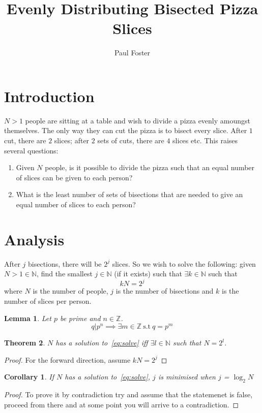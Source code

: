 \documentclass{article}
\title{Evenly Distributing Bisected Pizza Slices}
\author{Paul Foster}
\begin{document}
\maketitle

\newtheorem{theorem}{Theorem}
\newtheorem{corollary}{Corollary}[theorem]
\newtheorem{lemma}[theorem]{Lemma}

\section{Introduction}
$N>1$ people are sitting at a table and wish to divide a pizza evenly amoungst themselves. The only way they can cut the pizza is to bisect every slice. After $1$ cut, there are $2$ slices; after $2$ sets of cuts, there are $4$ slices etc. This raises several questions:
\begin{enumerate}
  \item Given $N$ people, is it possible to divide the pizza such that an equal number of slices can be given to each person?
  \item What is the least number of sets of bisections that are needed to give an equal number of slices to each person?
\end{enumerate}

\section{Analysis}
After $j$ bisections, there will be $2^j$ slices. So we wish to solve the following: given $N>1 \in \mathbb{N}$, find the smallest $j \in \mathbb{N}$ (if it exists) such that $\exists k \in \mathbb{N}$ such that
\begin{equation} \label{eq:solve}
  kN = 2^j
\end{equation}
where $N$ is the number of people, $j$ is the number of bisections and $k$ is the number of slices per person.

\begin{lemma}
Let $p$ be prime and $n \in \mathbb{Z}$.
\begin{equation}
  q | p^n \implies \exists m \in \mathbb{Z}~\text{s.t}~q = p^m
\end{equation}
\end{lemma}

\begin{theorem}
$N$ has a solution to~\eqref{eq:solve} iff $\exists l \in \mathbb{N}$ such that $N = 2^l$.
\end{theorem}

\begin{proof}
For the forward direction, assume $kN=2^j$
\end{proof}


\begin{corollary}
If $N$ has a solution to~\eqref{eq:solve}, $j$ is minimised when $j$ = $\log_2 N$
\end{corollary}

\begin{proof}
To prove it by contradiction try and assume that the statemenet is false,
proceed from there and at some point you will arrive to a contradiction.
\end{proof}
\end{document}
